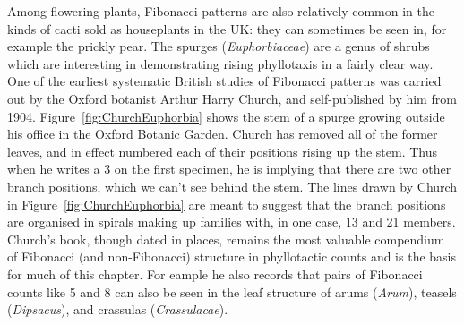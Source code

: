 Among flowering plants, Fibonacci patterns are also relatively common in the kinds of cacti sold as houseplants in the UK: they can sometimes be seen in, for example the prickly pear. The spurges (\textit{Euphorbiaceae}) are a genus of shrubs which are interesting in demonstrating rising phyllotaxis in a fairly clear way. One of the earliest systematic British studies of Fibonacci patterns was carried out by the Oxford botanist Arthur Harry Church, and self-published by him from 1904.  Figure~\ref{fig:ChurchEuphorbia} shows the stem of a spurge growing outside his office in the Oxford Botanic Garden.
%
Church has removed all of the former leaves, and in effect numbered each of their positions rising up the stem. Thus when he writes a 3 on the first specimen, he is implying that there are two other branch positions, which we can't see behind the stem. 
The lines drawn by Church in Figure~\ref{fig:ChurchEuphorbia}  are meant to suggest that the branch positions are organised in spirals making up families with, in one case, 13 and 21 members.  Church's book, though dated in places, remains the most valuable compendium of Fibonacci (and non-Fibonacci) structure in phyllotactic counts and is the basis for much of this chapter. For eample he also records that pairs of Fibonacci counts like 5 and 8 can also be seen in the leaf structure of arums (\textit{Arum}), teasels (\textit{Dipsacus}), and crassulas (\textit{Crassulacae}).
 \\\mbox{}
 
